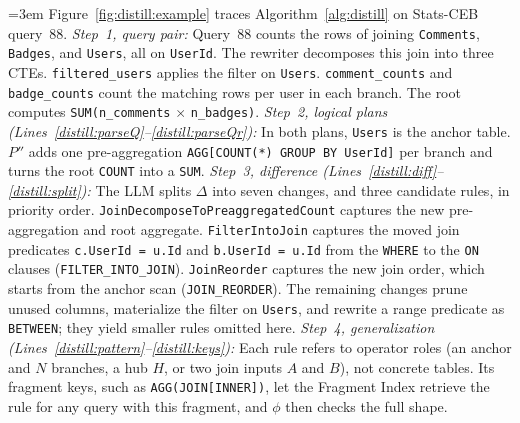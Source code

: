 \begin{example}\label{ex:1}
\emergencystretch=3em
Figure~\ref{fig:distill:example} traces Algorithm~\ref{alg:distill} on Stats-CEB query~88.
\emph{Step~1, query pair:}
Query~88 counts the rows of joining \texttt{Comments}, \texttt{Badges}, and \texttt{Users}, all on \texttt{UserId}.
The rewriter decomposes this join into three CTEs.
\texttt{filtered\_users} applies the filter on \texttt{Users}.
\texttt{comment\_counts} and \texttt{badge\_counts} count the matching rows per user in each branch.
The root computes \texttt{SUM(n\_comments} $\times$ \texttt{n\_badges)}.
\emph{Step~2, logical plans (Lines~\ref{distill:parseQ}--\ref{distill:parseQr}):}
In both plans, \texttt{Users} is the anchor table.
$P''$ adds one pre-aggregation \texttt{AGG[COUNT(*) GROUP BY UserId]} per branch and turns the root \texttt{COUNT} into a \texttt{SUM}.
\emph{Step~3, difference (Lines~\ref{distill:diff}--\ref{distill:split}):}
The LLM splits $\Delta$ into seven changes, and three candidate rules, in priority order.
\texttt{JoinDecomposeTo\allowbreak Preaggregated\allowbreak Count} captures the new pre-aggregation and root aggregate.
\texttt{FilterIntoJoin} captures the moved join predicates \texttt{c.UserId = u.Id} and \texttt{b.UserId = u.Id} from the \texttt{WHERE} to the \texttt{ON} clauses (\texttt{FILTER\_\allowbreak INTO\_\allowbreak JOIN}).
\texttt{JoinReorder} captures the new join order, which starts from the anchor scan (\texttt{JOIN\_REORDER}).
The remaining changes prune unused columns, materialize the filter on \texttt{Users}, and rewrite a range predicate as \texttt{BETWEEN}; they yield smaller rules omitted here.
\emph{Step~4, generalization (Lines~\ref{distill:pattern}--\ref{distill:keys}):}
Each rule refers to operator roles (an anchor and $N$ branches, a hub $H$, or two join inputs $A$ and $B$), not concrete tables.
Its fragment keys, such as \texttt{AGG(JOIN[INNER])}, let the Fragment Index retrieve the rule for any query with this fragment, and $\phi$ then checks the full shape.\shorten
\end{example}



